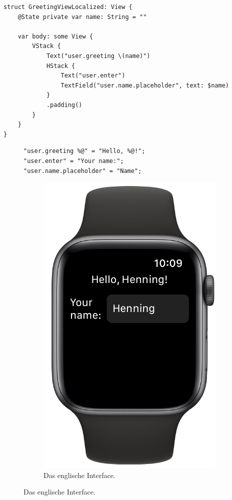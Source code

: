 \begin{lstlisting}[caption={\texttt{GreetingViewLocalized.swift}},label={lst:swiftui-greeting-loc}]
struct GreetingViewLocalized: View {
    @State private var name: String = ""

    var body: some View {
        VStack {
            Text("user.greeting \(name)")
            HStack {
                Text("user.enter")
                TextField("user.name.placeholder", text: $name)
            }
            .padding()
        }
    }
}
\end{lstlisting}\setcounter{lstannotation}{0}

\begin{figure}[ht]
\begin{minipage}{0.5\textwidth}
\begin{lstlisting}[title={\texttt{Localizable.strings (English)}},label={lst:swiftui-greeting-en}]
"user.greeting %@" = "Hello, %@!";
"user.enter" = "Your name:";
"user.name.placeholder" = "Name";
\end{lstlisting}\setcounter{lstannotation}{0}
\begin{figure}[H]
\centering
\includegraphics[width=.6\textwidth]{./images/methodology/swiftui/watch-en.png}
\caption{\label{bsp:ui:en}Das englische Interface.}
\end{figure}
\end{minipage}

\end{figure}
